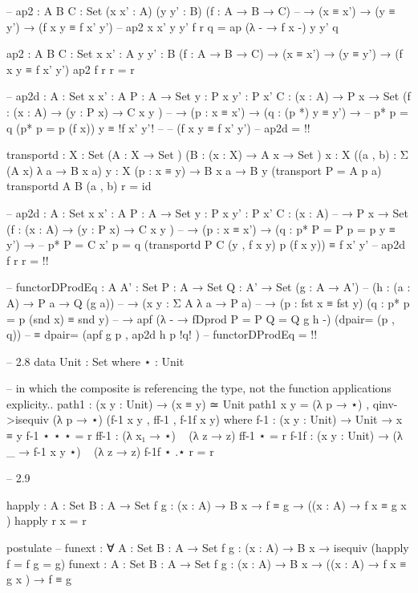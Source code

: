 \documentclass[11pt, a4paper]{article}
\begin{document}
\begin{code}
  -- ap2 : {A B C : Set} (x x' : A) (y y' : B) (f : A → B → C)
  --          → (x ≡ x') → (y ≡ y') → (f x y ≡ f x' y')
  -- ap2 x x' y y' f r q = ap (λ - → f x -) y y' q

  ap2 : {A B C : Set} {x x' : A} {y y' : B} (f : A → B → C)
        → (x ≡ x') → (y ≡ y') → (f x y ≡ f x' y')
  ap2 f r r = r

  -- ap2d : {A : Set} {x x' : A}  {P : A → Set} {y : P x} {y' : P x'} {C : (x : A) → P x → Set} (f : (x : A) → (y : P x) → C x y )
  --   → (p : x ≡ x') → (q : (p *) y ≡ y') →
  --   p* {p = q} (p* {p = p} (f x)) y ≡ {!f x' y'!}
  --   -- (f x y ≡ f x' y')
  -- ap2d = {!!}

  transportd : {X : Set } (A : X → Set  ) (B : (x : X) → A x → Set )
    {x : X} ((a , b) : Σ (A x) λ a → B x a) {y : X} (p : x ≡ y)
    → B x a → B y (transport {P = A} p a)
  transportd A B (a , b) r = id

  -- ap2d : {A : Set} {x x' : A}  {P : A → Set} {y : P x} {y' : P x'} {C : (x : A)
  --   → P x → Set} (f : (x : A) → (y : P x) → C x y )
  --   → (p : x ≡ x') → (q : p* {P = P} {p = p} y ≡ y') → 
  --   p* {P = C x'} {p = q} (transportd P C (y , f x y) p (f x y)) ≡ f x' y'
  -- ap2d f r r = {!!}

  -- functorDProdEq : {A A' : Set} {P : A → Set} {Q : A' → Set} (g : A → A') 
  --                  (h : (a : A) →  P a → Q (g a))
  --                  → (x y : Σ A λ a → P a)
  --                  → (p : fst x ≡ fst y) (q : p* {p = p} (snd x) ≡ snd y)
  --                  → apf (λ - → fDprod {P = P} {Q = Q} g h -) (dpair= (p , q))
  --                  ≡ dpair= (apf g p , ap2d h p {!q!} )
  -- functorDProdEq = {!!}


  -- 2.8
  data Unit : Set where
    ⋆ : Unit

  -- in which the composite is referencing the type, not the function applications explicity..
  path1 : (x y : Unit) → (x ≡ y) ≃ Unit
  path1 x y = (λ p → ⋆) , qinv->isequiv (λ p → ⋆) (f-1 x y , ff-1 , f-1f x y)
    where
      f-1 : (x y : Unit) → Unit → x ≡ y
      f-1 ⋆ ⋆ ⋆ = r
      ff-1 : (λ x₁ → ⋆) ~ (λ z → z)
      ff-1 ⋆ = r
      f-1f : (x y : Unit) → (λ _ → f-1 x y ⋆) ~ (λ z → z)
      f-1f ⋆ .⋆ r = r

  -- 2.9

  happly : {A : Set} {B : A → Set} {f g : (x : A) → B x} → f ≡ g → ((x : A) → f x ≡ g x )
  happly r x = r

  postulate
    -- funext : ∀ {A : Set} {B : A → Set} {f g : (x : A) → B x} → isequiv (happly {f = f} {g = g})
    funext : {A : Set} {B : A → Set} {f g : (x : A) → B x} →  ((x : A) → f x ≡ g x ) → f ≡ g


\end{code}
\end{document}
